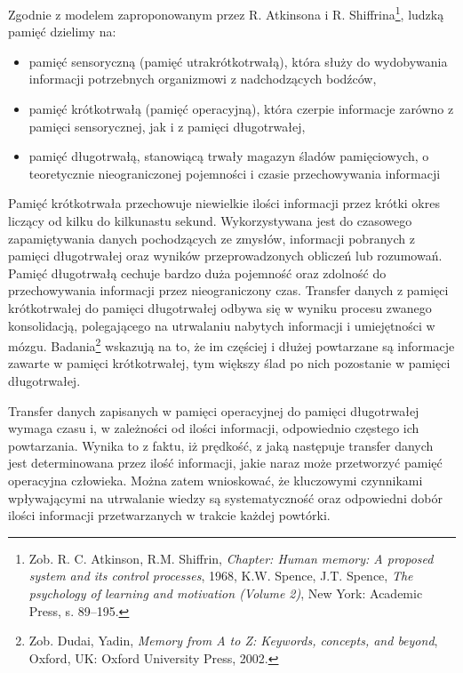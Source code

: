\documentclass{pracamgr}
\begin{document}
Zgodnie z modelem zaproponowanym przez R. Atkinsona i R. Shiffrina\footnote{Zob. R. C. Atkinson, R.M. Shiffrin, \textit{Chapter: Human memory: A proposed system and its control processes}, 1968, K.W. Spence, J.T. Spence, \textit{The psychology of learning and motivation (Volume 2)}, New York: Academic Press, s. 89–195.}, ludzką pamięć dzielimy na:
\begin{itemize}
\item pamięć sensoryczną (pamięć utrakrótkotrwałą), która służy do wydobywania informacji potrzebnych organizmowi z nadchodzących bodźców,
\item pamięć krótkotrwałą (pamięć operacyjną), która czerpie informacje zarówno z pamięci sensorycznej, jak i z pamięci długotrwałej,
\item pamięć długotrwałą, stanowiącą trwały magazyn śladów pamięciowych, o teoretycznie nieograniczonej pojemności i czasie przechowywania informacji
\end{itemize}  
Pamięć krótkotrwała przechowuje niewielkie ilości informacji przez krótki okres liczący od kilku do kilkunastu sekund. Wykorzystywana jest do czasowego zapamiętywania danych pochodzących ze zmysłów, informacji pobranych z pamięci długotrwałej oraz wyników przeprowadzonych obliczeń lub rozumowań. Pamięć długotrwałą cechuje bardzo duża pojemność oraz zdolność do przechowywania informacji przez nieograniczony czas. Transfer danych z pamięci krótkotrwałej do pamięci długotrwałej odbywa się w wyniku procesu zwanego konsolidacją, polegającego na utrwalaniu nabytych informacji i umiejętności w mózgu. Badania\footnote{Zob. Dudai, Yadin, \textit{Memory from A to Z: Keywords, concepts, and beyond}, Oxford, UK: Oxford University Press, 2002.} wskazują na to, że im częściej i dłużej powtarzane są informacje zawarte w pamięci krótkotrwałej, tym większy ślad po nich pozostanie w pamięci długotrwałej.

Transfer danych zapisanych w pamięci operacyjnej do pamięci długotrwałej wymaga czasu i, w zależności od ilości informacji, odpowiednio częstego ich powtarzania. Wynika to z faktu, iż prędkość, z jaką następuje transfer danych jest determinowana przez ilość informacji, jakie naraz może przetworzyć pamięć operacyjna człowieka. Można zatem wnioskować, że kluczowymi czynnikami wpływającymi na utrwalanie wiedzy są systematyczność oraz odpowiedni dobór ilości informacji przetwarzanych w trakcie każdej powtórki.
\end{document}
